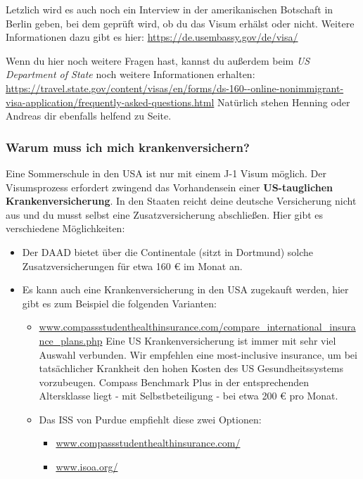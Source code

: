 \documentclass[
  paper=a4,
  fontsize=12pt,
  DIV=16,
  headheight=52pt,
  footheight=45pt,
  headinclude,
  parskip=full,
]{scrartcl}
\begin{document}
Letzlich wird es auch noch ein Interview in der amerikanischen Botschaft in Berlin geben, bei dem geprüft wird, ob du das Visum erhälst oder nicht.
Weitere Informationen dazu gibt es hier: \url{https://de.usembassy.gov/de/visa/}

Wenn du hier noch weitere Fragen hast, kannst du außerdem beim \textit{US Department of State} noch weitere Informationen erhalten: \url{https://travel.state.gov/content/visas/en/forms/ds-160--online-nonimmigrant-visa-application/frequently-asked-questions.html}
Natürlich stehen Henning oder Andreas dir ebenfalls helfend zu Seite.


\subsubsection*{Warum muss ich mich krankenversichern?}
Eine Sommerschule in den USA ist nur mit einem J-1 Visum möglich.
Der Visumsprozess erfordert zwingend das Vorhandensein einer \textbf{US-tauglichen Krankenversicherung}.
In den Staaten reicht deine deutsche Versicherung nicht aus und du musst selbst eine Zusatzversicherung abschließen.
Hier gibt es verschiedene Möglichkeiten:
\begin{itemize}
  \item Der DAAD bietet über die Continentale (sitzt in Dortmund) solche
  Zusatzversicherungen für etwa 160 € im Monat an.
  \item Es kann auch eine Krankenversicherung in den USA zugekauft werden, hier
  gibt es zum Beispiel die folgenden Varianten:
  \begin{itemize}
    \item \url{www.compassstudenthealthinsurance.com/compare_international_insurance_plans.php}
    Eine US Krankenversicherung ist immer mit sehr viel Auswahl verbunden.
    Wir empfehlen eine most-inclusive insurance, um bei tatsächlicher Krankheit den hohen Kosten des US Gesundheitssystems vorzubeugen.
    Compass Benchmark Plus in der entsprechenden Altersklasse liegt - mit Selbstbeteiligung - bei etwa 200 € pro Monat.
    \item Das ISS von Purdue empfiehlt diese zwei Optionen:
    \begin{itemize}
      \item \url{www.compassstudenthealthinsurance.com/}
      \item \url{www.isoa.org/}
    \end{itemize}
  \end{itemize}
\end{itemize}
\end{document}
